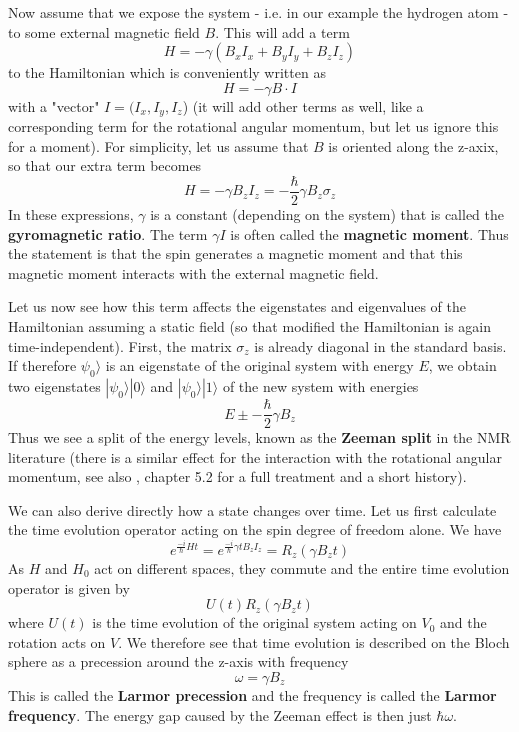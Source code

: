 \documentclass[a4paper, draft]{article}
\theoremstyle{own}
\theoremstyle{remark}
\begin{document}
Now assume that we expose the system - i.e. in our example the hydrogen atom - to some external magnetic field $B$. This will add a term
$$
H = - \gamma (B_x I_x + B_y I_y + B_z I_z )
$$
to the Hamiltonian which is conveniently written as
$$
H = -  \gamma B \cdot I
$$
with a "vector" $I = (I_x, I_y, I_z$) (it will add other terms as well, like a corresponding term for the rotational angular momentum, but let us ignore this for a moment). For simplicity, let us assume that $B$ is oriented along the z-axix, so that our extra term becomes
$$
H = - \gamma B_z I_z = - \frac{\hbar}{2} \gamma B_z \sigma_z
$$
In these expressions, $\gamma$ is a constant (depending on the system) that is called the {\bf gyromagnetic ratio}. The term $\gamma I$ is often called the {\bf magnetic moment}. Thus the statement is that the spin generates a magnetic moment and that this magnetic moment interacts with the external magnetic field.

Let us now see how this term affects the eigenstates and eigenvalues of the Hamiltonian assuming a static field (so that modified the Hamiltonian is again time-independent). First, the matrix $\sigma_z$ is already diagonal in the standard basis. If therefore $\psi_0 \rangle$ is an eigenstate of the original system with energy $E$, we obtain two eigenstates $|\psi_0 \rangle |0 \rangle$ and $|\psi_0 \rangle |1 \rangle$ of the new system with energies
$$
E \pm - \frac{\hbar}{2} \gamma B_z
$$
Thus we see a split of the energy levels, known as the {\bf Zeeman split} in the NMR literature (there is a similar effect for the interaction with the rotational angular momentum,  see also \cite{WeinbergQM}, chapter 5.2 for a full treatment and a short history). 

We can also derive directly how a state changes over time. Let us first calculate the time evolution operator acting on the spin degree of freedom alone. We have
$$
e^{\frac{-i}{\hbar}Ht}  = e^{\frac{-i}{\hbar} \gamma t B_z I_z} =   
R_z(\gamma B_z t)
$$
As $H$ and $H_0$ act on different spaces, they commute and the entire time evolution operator is given by
$$
U(t) R_z(\gamma B_z t)
$$
where $U(t)$ is the time evolution of the original system acting on $V_0$ and the rotation acts on $V$. We therefore see that time evolution is described on the Bloch sphere as a precession around the z-axis with frequency
$$
\omega = \gamma B_z 
$$
This is called the {\bf Larmor precession} and the frequency is called the {\bf Larmor frequency}. The energy gap caused by the Zeeman effect is then just $\hbar \omega$. 
\end{document}

